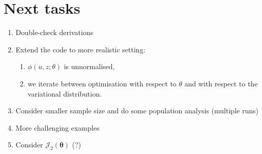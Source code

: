 \documentclass[11pt, oneside]{article}
\newcommand{\thetab}{{\boldsymbol{\theta}}}
\newcommand{\J}{\mathcal{J}}
\begin{document}
\section{Next tasks}
\begin{enumerate}
\item Double-check derivations
\item Extend the code to more realistic setting: 
  \begin{enumerate}
  \item  $\phi(u,z; \theta)$ is unnormalised, 
  \item we iterate between optimisation with respect to $\theta$ and with respect to the variational distribution.
  \end{enumerate}
\item Consider smaller sample size and do some population analysis (multiple runs)
\item More challenging examples
\item Consider $\J_2(\thetab)$ (?)
\end{enumerate}

\newpage


\end{document}
